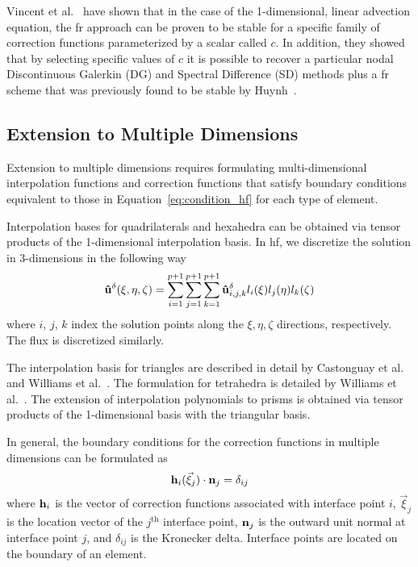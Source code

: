 Vincent et al.~\cite{vincent2011new} have shown that in the case of the 1-dimensional, linear advection equation, the \gls{fr} approach can be proven to be stable for a specific family of correction functions parameterized by a scalar called $c$. In addition, they showed that by selecting specific values of $c$ it is possible to recover a particular nodal Discontinuous Galerkin (DG) and Spectral Difference (SD) methods plus a \gls{fr} scheme that was previously found to be stable by Huynh~\cite{huynh2007flux}.

\subsection{Extension to Multiple Dimensions}

Extension to multiple dimensions requires formulating multi-dimensional interpolation functions and correction functions that satisfy boundary conditions equivalent to those in Equation~\eqref{eq:condition_hf} for each type of element.

Interpolation bases for quadrilaterals and hexahedra can be obtained via tensor products of the 1-dimensional interpolation basis. In \gls{hf}, we discretize the solution in 3-dimensions in the following way
\begin{equation}
{\bf \hat{u}}^\delta(\xi,\eta,\zeta) = \sum_{i=1}^{p+1} \sum_{j=1}^{p+1} \sum_{k=1}^{p+1}
{\bf \hat{u}}^\delta_{i,j,k} l_i(\xi) l_j(\eta) l_k(\zeta)
\end{equation}
where $i$, $j$, $k$ index the solution points along the $\xi, \eta, \zeta$ directions, respectively. The flux is discretized similarly.

The interpolation basis for triangles are described in detail by Castonguay et al.~\cite{castonguay2012new} and Williams et al.~\cite{williams2013tri}. The formulation for tetrahedra is detailed by Williams et al.~\cite{williams2013tet}. The extension of interpolation polynomials to prisms is obtained via tensor products of the 1-dimensional basis with the triangular basis\cite{castonguay2011}. 

In general, the boundary conditions for the correction functions in multiple dimensions can be formulated as
\begin{equation}\label{eq:genConstraint_hf}
{\bf h}_i( \vec{\xi}_j)\cdot {\bf n}_j = \delta_{ij}
\end{equation}
where ${\bf h}_i$ is the vector of correction functions associated with interface point $i$, $\vec{\xi}_j$ is the location vector of the $j^\text{th}$ interface point, ${\bf n}_j$ is the outward unit normal at interface point $j$, and $\delta_{ij}$ is the Kronecker delta. Interface points are located on the boundary of an element.

